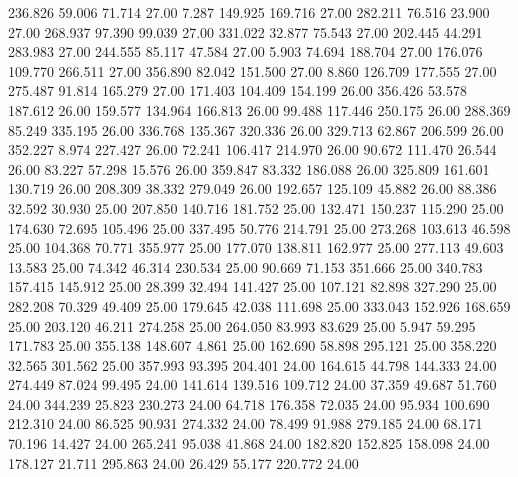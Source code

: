  236.826   59.006   71.714        27.00
   7.287  149.925  169.716        27.00
 282.211   76.516   23.900        27.00
 268.937   97.390   99.039        27.00
 331.022   32.877   75.543        27.00
 202.445   44.291  283.983        27.00
 244.555   85.117   47.584        27.00
   5.903   74.694  188.704        27.00
 176.076  109.770  266.511        27.00
 356.890   82.042  151.500        27.00
   8.860  126.709  177.555        27.00
 275.487   91.814  165.279        27.00
 171.403  104.409  154.199        26.00
 356.426   53.578  187.612        26.00
 159.577  134.964  166.813        26.00
  99.488  117.446  250.175        26.00
 288.369   85.249  335.195        26.00
 336.768  135.367  320.336        26.00
 329.713   62.867  206.599        26.00
 352.227    8.974  227.427        26.00
  72.241  106.417  214.970        26.00
  90.672  111.470   26.544        26.00
  83.227   57.298   15.576        26.00
 359.847   83.332  186.088        26.00
 325.809  161.601  130.719        26.00
 208.309   38.332  279.049        26.00
 192.657  125.109   45.882        26.00
  88.386   32.592   30.930        25.00
 207.850  140.716  181.752        25.00
 132.471  150.237  115.290        25.00
 174.630   72.695  105.496        25.00
 337.495   50.776  214.791        25.00
 273.268  103.613   46.598        25.00
 104.368   70.771  355.977        25.00
 177.070  138.811  162.977        25.00
 277.113   49.603   13.583        25.00
  74.342   46.314  230.534        25.00
  90.669   71.153  351.666        25.00
 340.783  157.415  145.912        25.00
  28.399   32.494  141.427        25.00
 107.121   82.898  327.290        25.00
 282.208   70.329   49.409        25.00
 179.645   42.038  111.698        25.00
 333.043  152.926  168.659        25.00
 203.120   46.211  274.258        25.00
 264.050   83.993   83.629        25.00
   5.947   59.295  171.783        25.00
 355.138  148.607    4.861        25.00
 162.690   58.898  295.121        25.00
 358.220   32.565  301.562        25.00
 357.993   93.395  204.401        24.00
 164.615   44.798  144.333        24.00
 274.449   87.024   99.495        24.00
 141.614  139.516  109.712        24.00
  37.359   49.687   51.760        24.00
 344.239   25.823  230.273        24.00
  64.718  176.358   72.035        24.00
  95.934  100.690  212.310        24.00
  86.525   90.931  274.332        24.00
  78.499   91.988  279.185        24.00
  68.171   70.196   14.427        24.00
 265.241   95.038   41.868        24.00
 182.820  152.825  158.098        24.00
 178.127   21.711  295.863        24.00
  26.429   55.177  220.772        24.00
